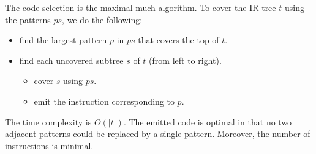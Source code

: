 \documentclass[a4paper, openany]{memoir}
\begin{document}
The code selection is the maximal much algorithm. To cover the IR tree $t$ using the patterns $ps$, we do the following:
\begin{itemize}
    \item find the largest pattern $p$ in $ps$ that covers the top of $t$.
    \item find each uncovered subtree $s$ of $t$ (from left to right).
    \begin{itemize}
        \item cover $s$ using $ps$.
        \item emit the instruction corresponding to $p$.
    \end{itemize}
\end{itemize}
The time complexity is $O(|t|)$. The emitted code is optimal in that no two adjacent patterns could be replaced by a single pattern. Moreover, the number of instructions is minimal.



    
\end{document}

